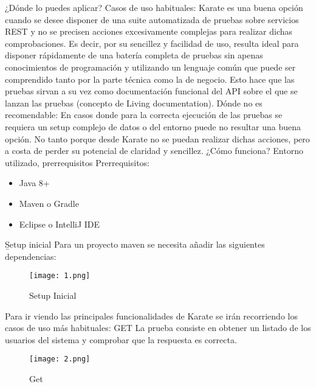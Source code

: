 \documentclass{article}
\begin{document}
\newline 
¿Dónde lo puedes aplicar?
\newline 
\newline
Casos de uso habituales:
\newline
Karate es una buena opción cuando se desee disponer de una suite automatizada de pruebas sobre servicios REST y no se precisen acciones excesivamente complejas para realizar dichas comprobaciones.
Es decir, por su sencillez y facilidad de uso, resulta ideal para disponer rápidamente de una batería completa de pruebas sin apenas conocimientos de programación y utilizando un lenguaje común que puede ser comprendido tanto por la parte técnica como la de negocio. Esto hace que las pruebas sirvan a su vez como documentación funcional del API sobre el que se lanzan las pruebas (concepto de Living documentation).
\newline 
\newline
Dónde no es recomendable:
\newline 
En casos donde para la correcta ejecución de las pruebas se requiera un setup complejo de datos o del entorno puede no resultar una buena opción. No tanto porque desde Karate no se puedan realizar dichas acciones, pero a costa de perder su potencial de claridad y sencillez.
\newline
\newline
\newline 
\newline
¿Cómo funciona?
\newline 
\newline
Entorno utilizado, prerrequisitos
Prerrequisitos:
\begin{itemize}
    \item Java 8+
    \item Maven o Gradle
    \item Eclipse o IntelliJ IDE
    \newline 
\end{itemize} 
\newline 
\newline 
\newline\b Setup inicial
\newline 
\newline 
Para un proyecto maven se necesita añadir las siguientes dependencias:

\begin{figure}[H]
\centering
\texttt{[image: 1.png]}
\caption{\label{fig:1}Setup Inicial}
\end{figure}
\newline 
Para ir viendo las principales funcionalidades de Karate se irán recorriendo los casos de uso más habituales:
\newline
\newline 
GET
\newline 
\newline 
La prueba consiste en obtener un listado de los usuarios del sistema y comprobar que la respuesta es correcta.
\begin{figure}[H]
\centering
\texttt{[image: 2.png]}
\caption{\label{fig:1}Get}
\end{figure}
\newline 
\end{document}
